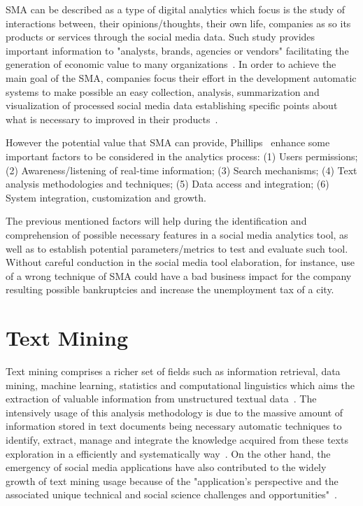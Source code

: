 \gls{SMA} can be described as a type of digital analytics which focus is the study of interactions between, their opinions/thoughts, their own life, companies as so its products or services through the social media data. Such study provides important information to "analysts, brands, agencies or vendors" facilitating the generation of economic value to many organizations~\cite{judah2012social}. In order to achieve the main goal of the \gls{SMA}, companies focus their effort in the development automatic systems to make possible an easy collection, analysis, summarization and visualization of processed social media data establishing specific points about what is necessary to improved in their products~\cite{zeng2010social}.

However the potential value that \gls{SMA} can provide, Phillips~\cite{judah2012social} enhance some important factors to be considered in the analytics process: (1) Users permissions; (2) Awareness/listening of real-time information; (3) Search mechanisms; (4) Text analysis methodologies and techniques; (5) Data access and integration; (6) System integration, customization and growth.

The previous mentioned factors will help during the identification and comprehension of possible necessary features in a social media analytics tool, as well as to establish potential parameters/metrics to test and evaluate such tool. Without careful conduction in the social media tool elaboration, for instance, use of a wrong technique of \gls{SMA} could have a bad business impact for the company resulting possible bankruptcies and increase the unemployment tax of a city.


\section{Text Mining}

Text mining comprises a richer set of fields such as information retrieval, data mining, machine learning, statistics and computational linguistics which aims the extraction of valuable information from unstructured textual data~\cite{he2013social}. The intensively usage of this analysis methodology is due to the massive amount of information stored in text documents being necessary automatic techniques to identify, extract, manage and integrate the knowledge acquired from these texts exploration in a efficiently and systematically way~\cite{ananiadou2015textmining}. On the other hand, the emergency of social media applications have also contributed to the widely growth of text mining usage because of the "application’s perspective and the associated unique technical and social science challenges and opportunities"~\cite{zeng2010social}.

